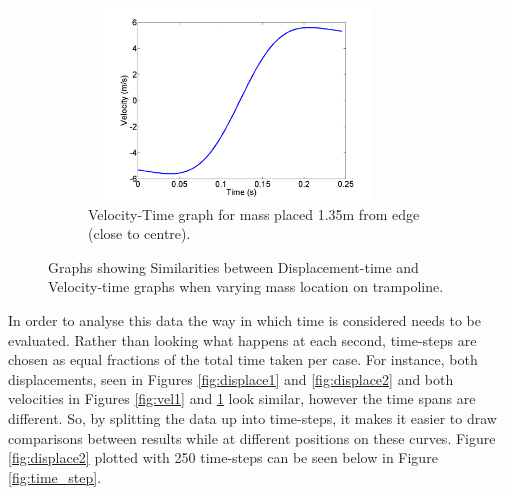 \begin{figure}[H]
\begin{subfigure}{0.45\textwidth}
		\includegraphics[width=3.1in, height=2in]{Vel_m1_144m_135fe.png}
    	\caption{Velocity-Time graph for mass placed 1.35m from edge (close to centre).}\label{fig:vel2}
    \end{subfigure}\hfill
     \caption{Graphs showing Similarities between Displacement-time and Velocity-time graphs when varying mass location on trampoline.}
   \label{fig:dvt}
\end{figure}

\noindent In order to analyse this data the way in which time is considered needs to be evaluated. Rather than looking what happens at each second, time-steps are chosen as equal fractions of the total time taken per case. For instance, both displacements, seen in Figures \ref{fig:displace1} and \ref{fig:displace2} and both velocities in Figures \ref{fig:vel1} and \ref{fig:vel2} look similar, however the time spans are different. So, by splitting the data up into time-steps, it makes it easier to draw comparisons between results while at different positions on these curves. Figure \ref{fig:displace2} plotted with 250 time-steps can be seen below in Figure \ref{fig:time_step}.%







